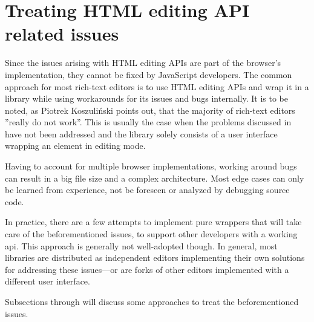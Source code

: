 
\section{Treating HTML editing API related issues}
\label{sec:ed_api_treating}

Since the issues arising with HTML editing APIs are part of the browser's implementation, they cannot be fixed by JavaScript developers. The common approach for most rich-text editors is to use HTML editing APIs and wrap it in a library while using workarounds for its issues and bugs internally. It is to be noted, as Piotrek Koszuli\'{n}ski points out, that the majority of rich-text editors ''really do not work''\cite{bj}. This is usually the case when the problems discussed in  have not been addressed and the library solely consists of a user interface wrapping an element in editing mode.


Having to account for multiple browser implementations, working around bugs can result in a big file size and a complex architecture. Most edge cases can only be learned from experience, not be foreseen or analyzed by debugging source code. %

In practice, there are a few attempts to implement pure wrappers that will take care of the beforementioned issues, to support other developers with a working api. This approach is generally not well-adopted though. In general, most libraries are distributed as independent editors implementing their own solutions for addressing these issues---or are forks of other editors implemented with a different user interface.

Subsections  through  will discuss some approaches to treat the beforementioned issues.





